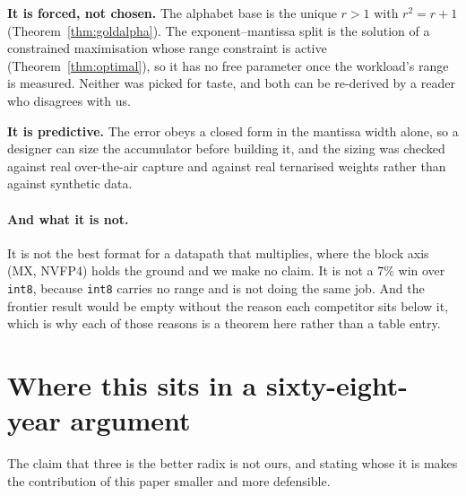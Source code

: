 \textbf{It is forced, not chosen.} The alphabet base is the unique $r>1$ with
$r^2=r+1$ (Theorem~\ref{thm:goldalpha}). The exponent--mantissa split is the
solution of a constrained maximisation whose range constraint is active
(Theorem~\ref{thm:optimal}), so it has no free parameter once the workload's
range is measured. Neither was picked for taste, and both can be re-derived by a
reader who disagrees with us.

\textbf{It is predictive.} The error obeys a closed form in the mantissa width
alone, so a designer can size the accumulator before building it, and the sizing
was checked against real over-the-air capture and against real ternarised weights
rather than against synthetic data.

\paragraph{And what it is not.} It is not the best format for a datapath that
multiplies, where the block axis (MX, NVFP4) holds the ground and we make no
claim. It is not a $7\%$ win over \texttt{int8}, because \texttt{int8} carries no
range and is not doing the same job. And the frontier result would be empty
without the reason each competitor sits below it, which is why each of those
reasons is a theorem here rather than a table entry.



\section{Where this sits in a sixty-eight-year argument}
\label{sec:history}



The claim that three is the better radix is not ours, and stating whose it is
makes the contribution of this paper smaller and more defensible.

